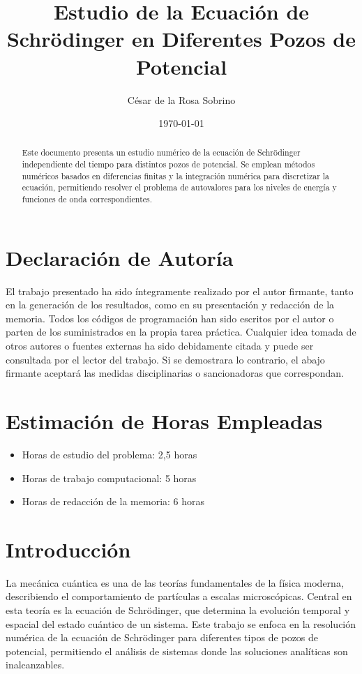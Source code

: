 \documentclass[a4paper,12pt]{article}
\title{Estudio de la Ecuación de Schrödinger en Diferentes Pozos de Potencial}
\author{César de la Rosa Sobrino}
\date{\today}
\begin{document}
\maketitle

\begin{abstract}
  Este documento presenta un estudio numérico de la ecuación de Schrödinger independiente del tiempo para distintos pozos de potencial. Se emplean métodos numéricos basados en diferencias finitas y la integración numérica para discretizar la ecuación, permitiendo resolver el problema de autovalores para los niveles de energía y funciones de onda correspondientes.
\end{abstract}

\section*{Declaración de Autoría}

El trabajo presentado ha sido íntegramente realizado por el autor firmante, tanto en la generación de los resultados, como en su presentación y redacción de la memoria. Todos los códigos de programación han sido escritos por el autor o parten de los suministrados en la propia tarea práctica. Cualquier idea tomada de otros autores o fuentes externas ha sido debidamente citada y puede ser consultada por el lector del trabajo. Si se demostrara lo contrario, el abajo firmante aceptará las medidas disciplinarias o sancionadoras que correspondan.

\section*{Estimación de Horas Empleadas}

\begin{itemize}
    \item Horas de estudio del problema: 2,5 horas
    \item Horas de trabajo computacional: 5 horas
    \item Horas de redacción de la memoria: 6 horas
\end{itemize}
\section{Introducción}
La mecánica cuántica es una de las teorías fundamentales de la física moderna, describiendo el comportamiento de partículas a escalas microscópicas. Central en esta teoría es la ecuación de Schrödinger, que determina la evolución temporal y espacial del estado cuántico de un sistema. Este trabajo se enfoca en la resolución numérica de la ecuación de Schrödinger para diferentes tipos de pozos de potencial, permitiendo el análisis de sistemas donde las soluciones analíticas son inalcanzables.
\end{document}
